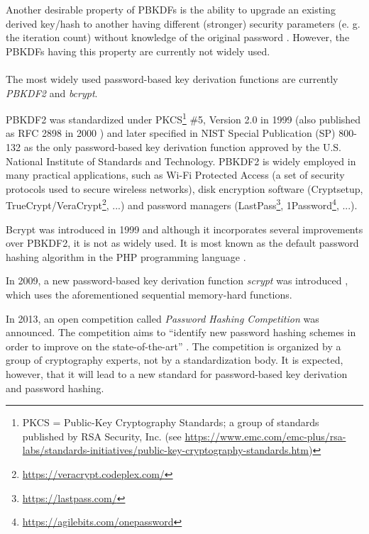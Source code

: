 \documentclass[12pt,oneside]{fithesis2}
\begin{document}
      Another desirable property of PBKDFs is the ability to upgrade an existing derived key/hash to another having different (stronger) security parameters (e. g. the iteration count) without knowledge of the original password \cite{openwall:pwHashing}. However, the PBKDFs having this property are currently not widely used.
      
      \paragraph*{}
      The most widely used password-based key derivation functions are currently \emph{PBKDF2} and \emph{bcrypt}.
      
      PBKDF2 was standardized under PKCS\footnote{PKCS = Public-Key Cryptography Standards; a group of standards published by RSA Security, Inc. (see \url{https://www.emc.com/emc-plus/rsa-labs/standards-initiatives/public-key-cryptography-standards.htm})} \#5, Version 2.0 in 1999 (also published as RFC 2898 in 2000 \cite{rfc2898}) and later specified in NIST Special Publication (SP) 800-132 \cite{nist:sp800:132} as the only password-based key derivation function approved by the U.S. National Institute of Standards and Technology. PBKDF2 is widely employed in many practical applications, such as Wi-Fi Protected Access (a set of security protocols used to secure wireless networks), disk encryption software (Cryptsetup, TrueCrypt/VeraCrypt\footnote{\url{https://veracrypt.codeplex.com/}}, ...) and password managers (LastPass\footnote{\url{https://lastpass.com/}}, 1Password\footnote{\url{https://agilebits.com/onepassword}}, ...).
      
      Bcrypt was introduced in 1999 \cite{bcrypt} and although it incorporates several improvements over PBKDF2, it is not as widely used. It is most known as the default password hashing algorithm in the PHP programming language \cite{php:passwordHash}.
      
      In 2009, a new password-based key derivation function \emph{scrypt} was introduced \cite{scrypt}, which uses the aforementioned sequential memory-hard functions.
      
      \label{p:phc}
      In 2013, an open competition called \emph{Password Hashing Competition} was announced. The competition aims to ``identify new password hashing schemes in order to improve on the state-of-the-art'' \cite{phc}. The competition is organized by a group of cryptography experts, not by a standardization body. It is expected, however, that it will lead to a new standard for password-based key derivation and password hashing.
      
\end{document}
